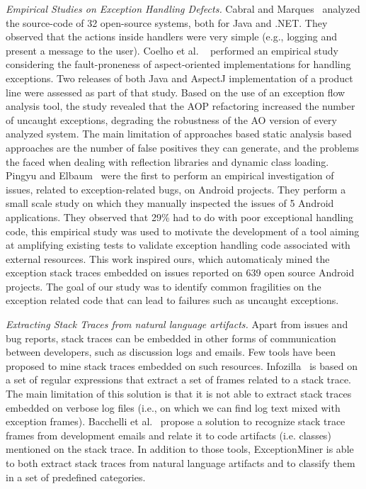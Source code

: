 \documentclass[conference]{IEEEtran}
\begin{document}
\textit{Empirical Studies on Exception Handling Defects.} 
Cabral and Marques~\cite{cabral2007exception} analyzed the
source-code of 32 open-source systems, both for Java and .NET. They
observed that the actions inside handlers were very simple (e.g., logging and present a
message to the user). Coelho et al.  ~\cite{coelho2008assessing} performed an 
empirical study considering the fault-proneness of aspect-oriented implementations 
for handling exceptions. Two releases of both Java and AspectJ implementation of a 
product line were assessed as part of that study. Based on the use of an exception
flow analysis tool, the study revealed that the AOP  refactoring increased the 
number of uncaught exceptions, degrading the robustness of the AO version of every analyzed system.
The main limitation of approaches based static analysis based approaches are the number of false
positives they can generate, and the problems the faced when dealing with reflection libraries 
and dynamic class loading. Pingyu and Elbaum~\cite{Zhang12} were the first to perform
an empirical investigation of issues, related to exception-related bugs, on Android projects.  
They perform a small scale study on which they manually inspected the issues of 
5 Android applications. They observed that 29\% had to do with poor
exceptional handling code, this empirical study was used to motivate the development of a tool
aiming at amplifying existing tests to validate exception 
handling code associated with external resources. This work inspired ours,
 which automaticaly mined the exception stack traces embedded on issues 
reported on 639 open source Android projects. The goal of our study was
to identify common fragilities on the exception related code that can lead to 
failures such as uncaught exceptions. 

\textit{Extracting Stack Traces from natural language artifacts.} 
Apart from issues and bug reports, stack traces can be embedded in other forms of
communication between developers, such as discussion logs and emails.
Few tools have been proposed to mine stack traces embedded on such resources.
 Infozilla~\cite{bettenburg2008extracting} is based on a set of regular expressions that extract a set of frames
related to a stack trace. The main limitation of this solution is that it is not
able to extract stack traces embedded on verbose log files (i.e., on which we
can find log text mixed with exception frames). Bacchelli
et al.~\cite{bacchelli2012content} propose a solution to recognize stack trace frames
from development emails and relate it to code artifacts (i.e. classes) mentioned
on the stack trace. In addition to those tools, ExceptionMiner is able to 
both extract stack traces from natural language artifacts and to 
classify them in a set of predefined categories.
\end{document}
